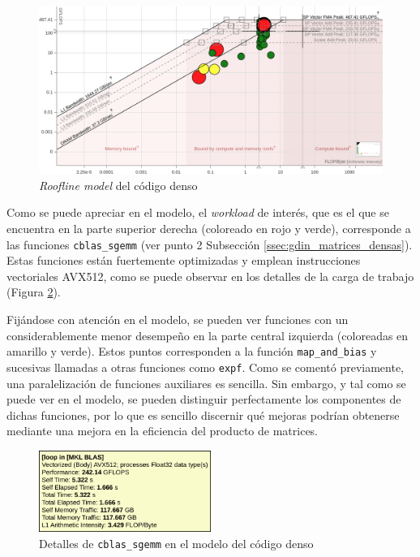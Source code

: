 \begin{figure}[h!]
    \centering
    \includegraphics[width=\textwidth]{img/rooflines/roofline_dense.png}
    \caption{\textit{Roofline model} del código denso}
    \label{fig:roofline_dense}
\end{figure}

Como se puede apreciar en el modelo, el \textit{workload} de interés, que es el que se encuentra en la parte superior derecha (coloreado en rojo y verde), corresponde a las funciones \texttt{cblas\_sgemm} (ver punto 2 Subsección \ref{ssec:gdin_matrices_densas}). Estas funciones están fuertemente optimizadas y emplean instrucciones vectoriales AVX512, como se puede observar en los detalles de la carga de trabajo (Figura \ref{fig:roofline_dense_details}).

Fijándose con atención en el modelo, se pueden ver funciones con un considerablemente menor desempeño en la parte central izquierda (coloreadas en amarillo y verde). Estos puntos corresponden a la función \texttt{map\_and\_bias} y sucesivas llamadas a otras funciones como \texttt{expf}. Como se comentó previamente, una paralelización de funciones auxiliares es sencilla. Sin embargo, y tal como se puede ver en el modelo, se pueden distinguir perfectamente los componentes de dichas funciones, por lo que es sencillo discernir qué mejoras podrían obtenerse mediante una mejora en la eficiencia del producto de matrices.

\begin{figure}[h!]
    \centering
    \includegraphics[width=0.5\textwidth]{img/rooflines/roofline_dense_details.png}
    \caption{Detalles de \texttt{cblas\_sgemm} en el modelo del código denso}
    \label{fig:roofline_dense_details}
\end{figure}

